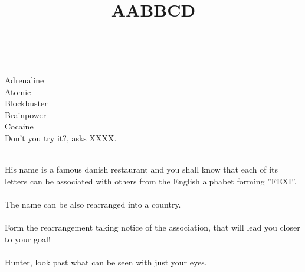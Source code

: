 \documentclass[12pt,a4paper]{article}
\title{AABBCD}
\date{}
\begin{document}
\maketitle
\thispagestyle{empty}
\ \\
\begin{center}
Adrenaline\\
Atomic\\
Blockbuster\\
Brainpower\\
Cocaine\\
Don't you try it?, asks XXXX.\\
\end{center}
\ \\
His name is a famous danish restaurant and you shall know
that each of its letters can be associated with others from the English alphabet
forming ”FEXI”.\\
\ \\
The name can be also rearranged into a country. \\
\ \\
Form
the rearrangement taking notice of the association, that will lead you closer to your
goal!\\
\ \\
Hunter, look past what can be seen with just your eyes.
\end{document}
